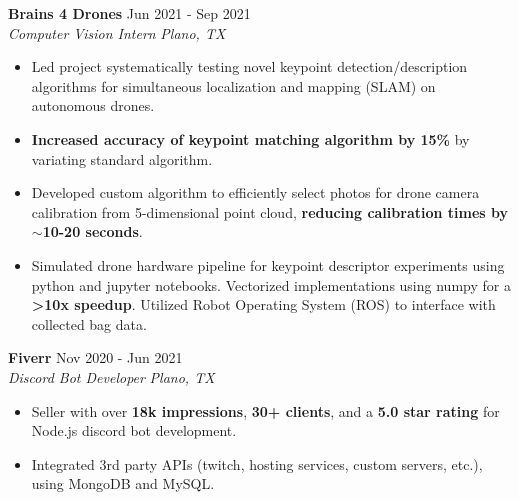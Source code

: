 \documentclass[a4paper]{article}
\begin{document}
\textbf{Brains 4 Drones} \hfill Jun 2021 - Sep 2021\\
\textit{Computer Vision Intern} \hfill \textit{Plano, TX} \\
\vspace{-1mm}
\begin{itemize} \itemsep -1pt
	\item Led project systematically testing novel keypoint detection/description algorithms for simultaneous localization and mapping (SLAM) on autonomous drones.
	\item \textbf{Increased accuracy of keypoint matching algorithm by 15\%} by variating standard algorithm.
        \item Developed custom algorithm to efficiently select photos for drone camera calibration from 5-dimensional point cloud, \textbf{reducing calibration times by $\sim{}$10-20 seconds}.
	\item Simulated drone hardware pipeline for keypoint descriptor experiments using python and jupyter notebooks. Vectorized implementations using numpy for a \textbf{>10x speedup}. Utilized Robot Operating System (ROS) to interface with collected bag data.
\end{itemize}
\textbf{Fiverr} \hfill Nov 2020 - Jun 2021\\
\textit{Discord Bot Developer} \hfill \textit{Plano, TX} \\
\vspace{-1mm}
\begin{itemize} \itemsep -1pt
	\item Seller with over \textbf{18k impressions}, \textbf{30+ clients}, and a \textbf{5.0 star rating} for Node.js discord bot development.
	\item Integrated 3rd party APIs (twitch, hosting services, custom servers, etc.), using MongoDB and MySQL.
\end{itemize}
\end{document}
